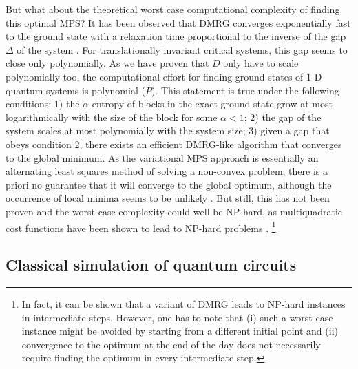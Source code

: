 \documentclass[aps,prl,epsfig,graphics,floatfix,mathbbm,a4paper]{article}
\newcommand{\1}{\mathbbm{1}}
\renewcommand{\>}{\rangle}
\newcommand{\<}{\langle}
\begin{document}
But what about the theoretical worst case computational complexity
of finding this optimal MPS? It has been observed that DMRG
converges exponentially fast to the ground state with a relaxation
time proportional to the inverse of the gap $\Delta$ of the system
\cite{DMRG1}. For translationally invariant critical systems, this
gap seems to close only polynomially. As we have proven that $D$
only have to scale polynomially too, the computational effort for
finding ground states of 1-D quantum systems is polynomial ($P$).
This statement is true under the following conditions: 1) the
$\alpha$-entropy of blocks in the exact ground state grow at most
logarithmically with the size of the block for some $\alpha<1$; 2)
the gap of the system scales at most polynomially with the system
size; 3) given a gap that obeys condition 2, there exists an
efficient DMRG-like algorithm that converges to the global
minimum. As the variational MPS approach \cite{VPC04} is
essentially an alternating least squares method of solving a
non-convex problem, there is a priori no guarantee that it will
converge to the global optimum, although the occurrence of local
minima seems to be  unlikely \cite{DMRG1}. But still, this has not
been proven and the worst-case complexity could well be NP-hard,
as multiquadratic cost functions have been shown to lead to
NP-hard problems \cite{Nemirovski}. \footnote{In fact, it can be
    shown \cite{Eisert} that a variant of DMRG leads to NP-hard
    instances in intermediate steps. However, one has to note that (i)
    such a worst case instance might be avoided by starting from a
    different initial point and (ii) convergence to the optimum at the
    end of the day does not necessarily require finding the optimum in
    every intermediate step.}


\subsection{Classical simulation of quantum circuits}
\end{document}
